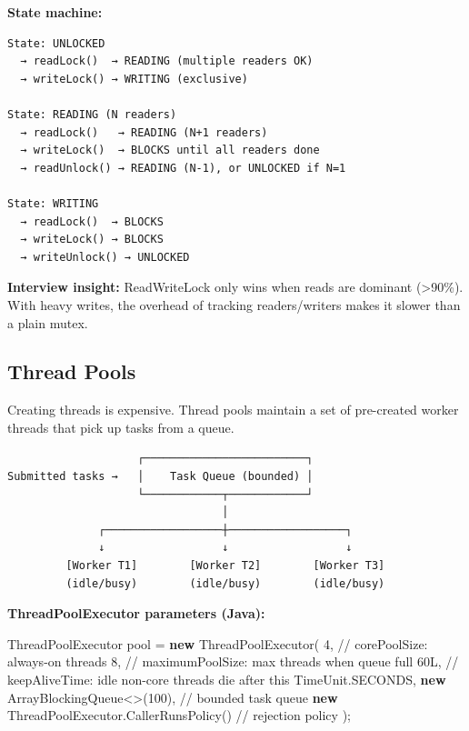 \documentclass[11pt]{article}
\newenvironment{Shaded}{\begin{snugshade}}{\end{snugshade}}
\newcommand{\BuiltInTok}[1]{\textcolor[rgb]{0.50,0.55,0.55}{#1}}
\newcommand{\CommentTok}[1]{\textcolor[rgb]{0.48,0.49,0.49}{#1}}
\newcommand{\DecValTok}[1]{\textcolor[rgb]{0.96,0.45,0.00}{#1}}
\newcommand{\FunctionTok}[1]{\textcolor[rgb]{0.56,0.27,0.68}{#1}}
\newcommand{\KeywordTok}[1]{\textcolor[rgb]{0.81,0.81,0.76}{\textbf{#1}}}
\newcommand{\NormalTok}[1]{\textcolor[rgb]{0.81,0.81,0.76}{#1}}
\newcommand{\OperatorTok}[1]{\textcolor[rgb]{0.81,0.81,0.76}{#1}}
\begin{document}
\textbf{State machine:}

\setcodelang{}

\begin{verbatim}
State: UNLOCKED
  → readLock()  → READING (multiple readers OK)
  → writeLock() → WRITING (exclusive)

State: READING (N readers)
  → readLock()   → READING (N+1 readers)
  → writeLock()  → BLOCKS until all readers done
  → readUnlock() → READING (N-1), or UNLOCKED if N=1

State: WRITING
  → readLock()  → BLOCKS
  → writeLock() → BLOCKS
  → writeUnlock() → UNLOCKED
\end{verbatim}

\textbf{Interview insight:} ReadWriteLock only wins when reads are dominant (\textgreater90\%). With heavy writes, the overhead of tracking readers/writers makes it slower than a plain mutex.

\subsection{Thread Pools}\label{thread-pools}

Creating threads is expensive. Thread pools maintain a set of pre-created worker threads that pick up tasks from a queue.

\setcodelang{}

\begin{verbatim}
                    ┌─────────────────────────┐
Submitted tasks →   │    Task Queue (bounded) │
                    └────────────┬────────────┘
                                 │
              ┌──────────────────┼──────────────────┐
              ↓                  ↓                  ↓
         [Worker T1]        [Worker T2]        [Worker T3]
         (idle/busy)        (idle/busy)        (idle/busy)
\end{verbatim}

\textbf{ThreadPoolExecutor parameters (Java):}


\begin{Shaded}
\begin{Highlighting}[]
\BuiltInTok{ThreadPoolExecutor}\NormalTok{ pool }\OperatorTok{=} \KeywordTok{new} \BuiltInTok{ThreadPoolExecutor}\OperatorTok{(}
    \DecValTok{4}\OperatorTok{,}           \CommentTok{// corePoolSize: always{-}on threads}
    \DecValTok{8}\OperatorTok{,}           \CommentTok{// maximumPoolSize: max threads when queue full}
    \DecValTok{60L}\OperatorTok{,}         \CommentTok{// keepAliveTime: idle non{-}core threads die after this}
    \BuiltInTok{TimeUnit}\OperatorTok{.}\FunctionTok{SECONDS}\OperatorTok{,}
    \KeywordTok{new} \BuiltInTok{ArrayBlockingQueue}\OperatorTok{\textless{}\textgreater{}(}\DecValTok{100}\OperatorTok{),}  \CommentTok{// bounded task queue}
    \KeywordTok{new} \BuiltInTok{ThreadPoolExecutor}\OperatorTok{.}\FunctionTok{CallerRunsPolicy}\OperatorTok{()}  \CommentTok{// rejection policy}
\OperatorTok{);}
\end{Highlighting}
\end{Shaded}
\end{document}
